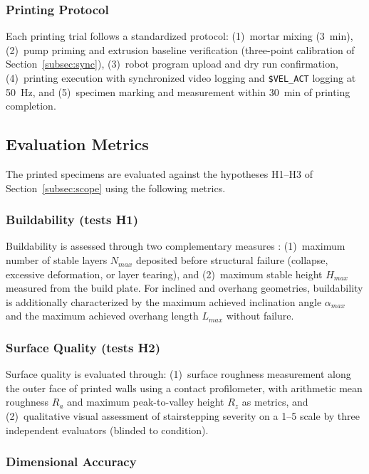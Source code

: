 \documentclass[conference]{IEEEtran}
\begin{document}
\subsubsection{Printing Protocol}

Each printing trial follows a standardized protocol: (1)~mortar mixing (3~min), (2)~pump priming and extrusion baseline verification (three-point calibration of Section~\ref{subsec:sync}), (3)~robot program upload and dry run confirmation, (4)~printing execution with synchronized video logging and \texttt{\$VEL\_ACT} logging at 50~Hz, and (5)~specimen marking and measurement within 30~min of printing completion.

\subsection{Evaluation Metrics}
\label{subsec:eval}

The printed specimens are evaluated against the hypotheses H1--H3 of Section~\ref{subsec:scope} using the following metrics.

\subsubsection{Buildability (tests H1)}

Buildability is assessed through two complementary measures \cite{bos_juxtaposing_2021, khan_impact_2024}: (1)~maximum number of stable layers $N_{max}$ deposited before structural failure (collapse, excessive deformation, or layer tearing), and (2)~maximum stable height $H_{max}$ measured from the build plate. For inclined and overhang geometries, buildability is additionally characterized by the maximum achieved inclination angle $\alpha_{max}$ and the maximum achieved overhang length $L_{max}$ without failure.

\subsubsection{Surface Quality (tests H2)}

Surface quality is evaluated through: (1)~surface roughness measurement along the outer face of printed walls using a contact profilometer, with arithmetic mean roughness $R_a$ and maximum peak-to-valley height $R_z$ as metrics, and (2)~qualitative visual assessment of stairstepping severity on a 1--5 scale by three independent evaluators (blinded to condition).

\subsubsection{Dimensional Accuracy}
\end{document}

